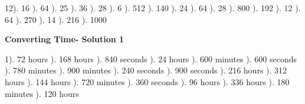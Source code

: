 \documentclass{article}%
\begin{document}
12). 16%
). 64%
). 25%
). 36%
). 28%
). 6%
). 512%
). 140%
). 24%
). 64%
). 28%
). 800%
). 192%
). 12%
). 64%
). 270%
). 14%
). 216%
). 1000%
\newline%
\newpage%
\large%
\begin{center}%
\textbf{Converting Time- Solution 1}%
\newline%
\end{center} \normalsize%
1). 72 hours%
). 168 hours%
). 840 seconds%
). 24 hours%
). 600 minutes%
). 600 seconds%
). 780 minutes%
). 900 minutes%
). 240 seconds%
). 900 seconds%
). 216 hours%
). 312 hours%
). 144 hours%
). 720 minutes%
). 360 seconds%
). 96 hours%
). 336 hours%
). 180 minutes%
). 120 hours%
\newline%
\end{document}
